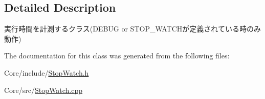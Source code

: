 \subsection{Detailed Description}
実行時間を計測するクラス(D\+E\+B\+UG or S\+T\+O\+P\+\_\+\+W\+A\+T\+C\+Hが定義されている時のみ動作) 

The documentation for this class was generated from the following files\+:\begin{DoxyCompactItemize}
\item 
Core/include/\hyperlink{_stop_watch_8h}{Stop\+Watch.\+h}\item 
Core/src/\hyperlink{_stop_watch_8cpp}{Stop\+Watch.\+cpp}\end{DoxyCompactItemize}
